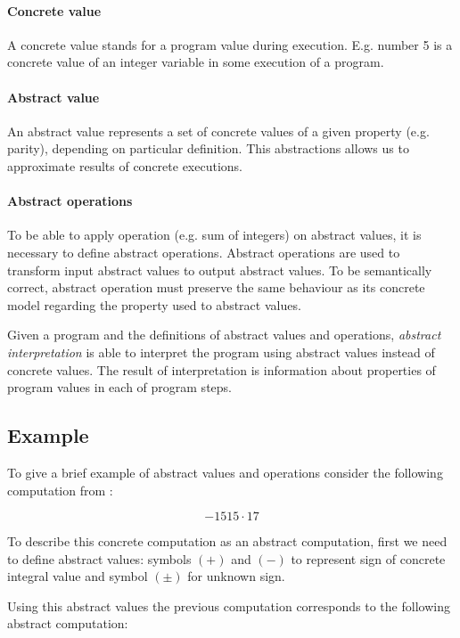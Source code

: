 \documentclass[12pt,oneside]{fithesis2}
\theoremstyle{definition}
\begin{document}
\paragraph{Concrete value}
A concrete value stands for a program value during execution. E.g. number 5 is a concrete value of an integer variable in some execution of a program.

\paragraph{Abstract value}
An abstract value represents a set of concrete values of a given property (e.g. parity), depending on particular definition. This abstractions allows us to approximate results of concrete executions.

\paragraph{Abstract operations}
To be able to apply operation (e.g. sum of integers) on abstract values, it is necessary to define abstract operations. Abstract operations are used to transform input abstract values to output abstract values. To be semantically correct, abstract operation must preserve the same behaviour as its concrete model regarding the property used to abstract values.

\vspace{1\baselineskip} %

Given a program and the definitions of abstract values and operations, \textit{abstract interpretation} is able to interpret the program using abstract values instead of concrete values. The result of interpretation is information about properties of program values in each of program steps.


\subsection{Example}\label{sec:example}

To give a brief example of abstract values and operations consider the following computation from \cite{CousotCousot77-1}:

\[ -1515 \cdot 17 \]

To describe this concrete computation as an abstract computation, first we need to define abstract values: symbols $(+)$ and $(-)$ to represent sign of concrete integral value and symbol $(\pm)$ for unknown sign.

Using this abstract values the previous computation corresponds to the following abstract computation:
\end{document}
